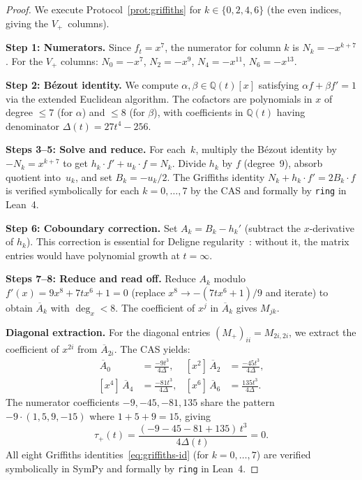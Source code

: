 \documentclass[11pt]{article}
\theoremstyle{plain}
\theoremstyle{definition}
\theoremstyle{remark}
\newcommand{\Q}{\mathbb{Q}}
\begin{document}
\begin{proof}
We execute Protocol~\ref{prot:griffiths} for $k \in \{0,2,4,6\}$
(the even indices, giving the $V_+$~columns).

\medskip
\noindent\textbf{Step 1: Numerators.}
Since $f_t = x^7$, the numerator for column $k$ is
$N_k = -x^{k+7}$.  For the $V_+$ columns:
$N_0 = -x^7$, $N_2 = -x^9$, $N_4 = -x^{11}$, $N_6 = -x^{13}$.

\medskip
\noindent\textbf{Step 2: B\'ezout identity.}
We compute $\alpha, \beta \in \Q(t)[x]$ satisfying
$\alpha f + \beta f' = 1$ via the extended Euclidean algorithm.
The cofactors are polynomials in $x$ of degree $\le 7$ (for $\alpha$)
and $\le 8$ (for $\beta$), with coefficients in $\Q(t)$ having
denominator $\Delta(t) = 27t^4 - 256$.

\medskip
\noindent\textbf{Steps 3--5: Solve and reduce.}
For each~$k$, multiply the B\'ezout identity by $-N_k = x^{k+7}$
to get $h_k \cdot f' + u_k \cdot f = N_k$.
Divide $h_k$ by $f$ (degree~9), absorb quotient into~$u_k$,
and set $B_k = -u_k/2$.  The Griffiths identity
$N_k + h_k \cdot f' = 2 B_k \cdot f$
is verified symbolically for each $k = 0,\ldots,7$ by the CAS
and formally by \texttt{ring} in Lean~4.

\medskip
\noindent\textbf{Step 6: Coboundary correction.}
Set $A_k = B_k - h_k'$ (subtract the $x$-derivative of $h_k$).
This correction is essential for Deligne
regularity~\cite{Deligne1971}: without it, the matrix entries
would have polynomial growth at $t = \infty$.

\medskip
\noindent\textbf{Steps 7--8: Reduce and read off.}
Reduce $A_k$ modulo $f'(x) = 9x^8 + 7tx^6 + 1 = 0$ (replace
$x^8 \to -(7tx^6 + 1)/9$ and iterate) to obtain
$\overline{A}_k$ with $\deg_x < 8$.  The coefficient of $x^j$
in $\overline{A}_k$ gives $M_{jk}$.

\medskip
\noindent\textbf{Diagonal extraction.}
For the diagonal entries $(M_+)_{ii} = M_{2i,2i}$, we extract
the coefficient of $x^{2i}$ from $\overline{A}_{2i}$.  The CAS
yields:
\begin{align*}
  [x^0]\, \overline{A}_0 &= \frac{-9t^3}{4\Delta}, &
  [x^2]\, \overline{A}_2 &= \frac{-45t^3}{4\Delta}, \\
  [x^4]\, \overline{A}_4 &= \frac{-81t^3}{4\Delta}, &
  [x^6]\, \overline{A}_6 &= \frac{135t^3}{4\Delta}.
\end{align*}
The numerator coefficients $-9, -45, -81, 135$ share the pattern
$-9 \cdot (1, 5, 9, -15)$ where $1 + 5 + 9 = 15$, giving
\[
  \tau_+(t) = \frac{(-9-45-81+135)\, t^3}{4\Delta(t)} = 0.
\]
All eight Griffiths identities~\eqref{eq:griffiths-id} (for
$k = 0,\ldots,7$) are verified symbolically in SymPy and
formally by \texttt{ring} in Lean~4.
\end{proof}
\end{document}
